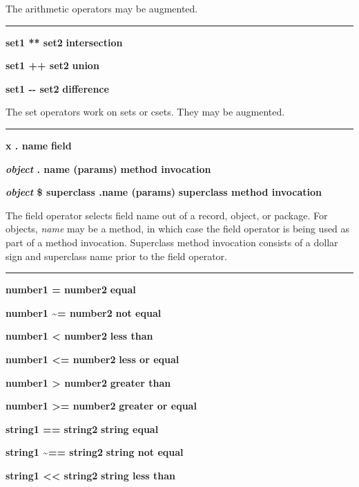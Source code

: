 \noindent
The arithmetic operators may be augmented.

\bigskip\hrule\vspace{0.1cm}
\noindent
{\bf set1 ** set2 } \hfill {\bf intersection}

\noindent
{\bf set1 ++ set2 } \hfill {\bf union}

\noindent
{\bf set1 -{}- set2 } \hfill {\bf difference}

\noindent
The set operators work on sets or csets. They may be augmented.

\bigskip\hrule\vspace{0.1cm}

\noindent
{\bf x . name } \hfill {\bf field}

\noindent
{\bf \textit{object} . name (params) } \hfill {\bf method invocation}

\noindent
{\bf \textit{object} \$ superclass .name (params) } \hfill {\bf superclass method invocation}

\noindent
The field operator selects field name out of a record,
object, or package. For objects, \textit{name} may be a method, in
which case the field operator is being used as part of a method
invocation. Superclass method invocation consists of a dollar sign and
superclass name prior to the field operator.

\bigskip\hrule\vspace{0.1cm}
\noindent
{\bf number1 = number2 } \hfill {\bf equal}

\noindent
{}
{\bf number1 \~{}= number2 } \hfill {\bf not equal}

\noindent
{\bf number1 {\textless} number2 } \hfill {\bf less than}

\noindent
{\bf number1 {\textless}= number2 } \hfill {\bf less or equal}

\noindent
{\bf number1 {\textgreater} number2 } \hfill {\bf greater than}

\noindent
{\bf number1 {\textgreater}= number2 } \hfill {\bf greater or equal}

\noindent
{\bf string1 == string2 } \hfill {\bf string equal}

\noindent
{\bf string1 \~{}== string2 } \hfill {\bf string not equal}

\noindent
{\bf string1 {\textless}{\textless} string2 } \hfill {\bf string less than}

